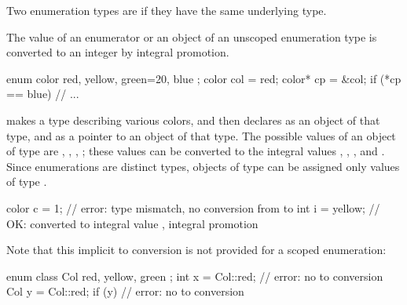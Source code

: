 \pnum
Two enumeration types are 
if they have the same underlying type.

\pnum
The value of an enumerator or an object of an unscoped enumeration type is
converted to an integer by integral promotion.
\begin{example}
%
\begin{codeblock}
  enum color { red, yellow, green=20, blue };
  color col = red;
  color* cp = &col;
  if (*cp == blue)              // ...
\end{codeblock}
makes  a type describing various colors, and then declares
 as an object of that type, and  as a pointer to an
object of that type. The possible values of an object of type
 are , , ,
; these values can be converted to the integral values
, , , and . Since enumerations are
distinct types, objects of type  can be assigned only
values of type .
\begin{codeblock}
color c = 1;                    // error: type mismatch, no conversion from  to 
int i = yellow;                 // OK:  converted to integral value , integral promotion
\end{codeblock}
Note that this implicit  to 
conversion is not provided for a scoped enumeration:
\begin{codeblock}
enum class Col { red, yellow, green };
int x = Col::red;               // error: no  to  conversion
Col y = Col::red;
if (y) { }                      // error: no  to  conversion
\end{codeblock}
\end{example}

